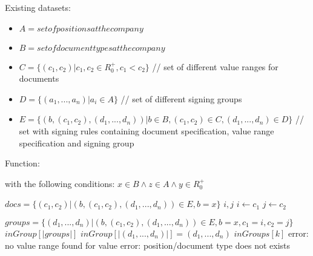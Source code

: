 	Existing datasets:
	\begin{itemize}
		\item $ A = set of positions at the company $
		\item $ B = set of document types at the company$
		\item $ C = \{(c_1, c_2) | c_1,c_2 \in \!R_0^+, c_1 < c_2 \}$ // set of different value ranges for documents
		\item $ D = \{(a_1, ... , a_n) | a_i \in A \}$ // set of different signing groups
		\item $ E = \{ (b, (c_1,c_2), (d_1, ... , d_n)) | b \in B, (c_1,c_2) \in C, (d_1, ..., d_n) \in D \}$ // set with signing rules containing document specification, value range specification and signing group
	\end{itemize}
	
	Function:
	\begin{algorithmic}
		 with the following conditions: $ x \in B \land z \in A \land y \in \!R_0^+$
		
			\State $ docs = \{ (c_1,c_2) | (b, (c_1, c_2), (d_1, ... , d_n)) \in E, b = x \}$
			\State $i,j$
					\State $ i \gets c_1$
					\State $ j \gets c_2$									
				\EndIf
			\EndFor
			
			\State $ groups = \{ (d_1, ... , d_n) | (b, (c_1, c_2), (d_1, ... , d_n)) \in E, b = x, c_1 = i, c_2 = j \}$
			\State $ inGroup[|groups|]$
					\State $inGroup [|(d_1, ... , d_n)|] = (d_1, ... , d_n)$
				\EndIf
			\EndFor
						\State \Return $inGroups[k]$
					\EndIf
				\EndFor
			\Else
				\State \Return error: no value range found for value
			\EndIf			
		\Else
			\State \Return error: position/document type does not exists
		\EndIf
		
		\EndFunction
	\end{algorithmic}
